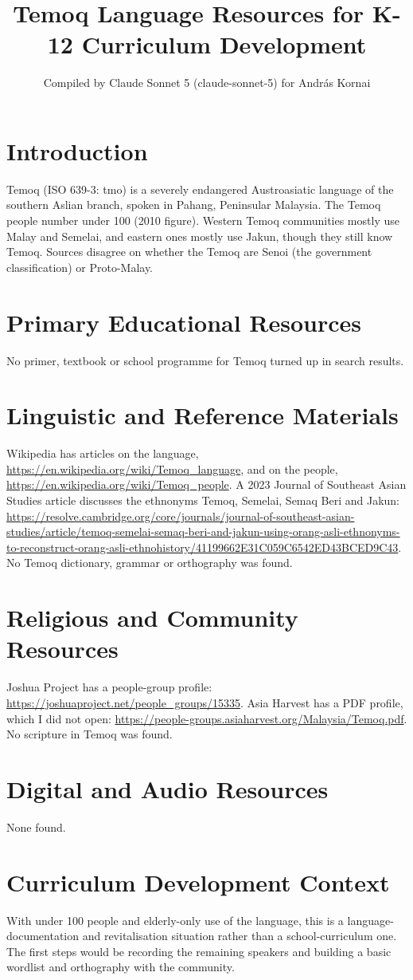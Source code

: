 \documentclass[12pt]{article}
\title{Temoq Language Resources for K-12 Curriculum Development}
\author{Compiled by Claude Sonnet 5 (claude-sonnet-5) for Andr\'as Kornai}
\date{}
\begin{document}
\maketitle

\section{Introduction}
Temoq (ISO 639-3: tmo) is a severely endangered Austroasiatic language of the southern Aslian branch, spoken in Pahang, Peninsular Malaysia. The Temoq people number under 100 (2010 figure). Western Temoq communities mostly use Malay and Semelai, and eastern ones mostly use Jakun, though they still know Temoq. Sources disagree on whether the Temoq are Senoi (the government classification) or Proto-Malay.

\section{Primary Educational Resources}
No primer, textbook or school programme for Temoq turned up in search results.

\section{Linguistic and Reference Materials}
Wikipedia has articles on the language, \url{https://en.wikipedia.org/wiki/Temoq_language}, and on the people, \url{https://en.wikipedia.org/wiki/Temoq_people}. A 2023 Journal of Southeast Asian Studies article discusses the ethnonyms Temoq, Semelai, Semaq Beri and Jakun: \url{https://resolve.cambridge.org/core/journals/journal-of-southeast-asian-studies/article/temoq-semelai-semaq-beri-and-jakun-using-orang-asli-ethnonyms-to-reconstruct-orang-asli-ethnohistory/41199662E31C059C6542ED43BCED9C43}. No Temoq dictionary, grammar or orthography was found.

\section{Religious and Community Resources}
Joshua Project has a people-group profile: \url{https://joshuaproject.net/people_groups/15335}. Asia Harvest has a PDF profile, which I did not open: \url{https://people-groups.asiaharvest.org/Malaysia/Temoq.pdf}. No scripture in Temoq was found.

\section{Digital and Audio Resources}
None found.

\section{Curriculum Development Context}
With under 100 people and elderly-only use of the language, this is a language-documentation and revitalisation situation rather than a school-curriculum one. The first steps would be recording the remaining speakers and building a basic wordlist and orthography with the community.
\end{document}
